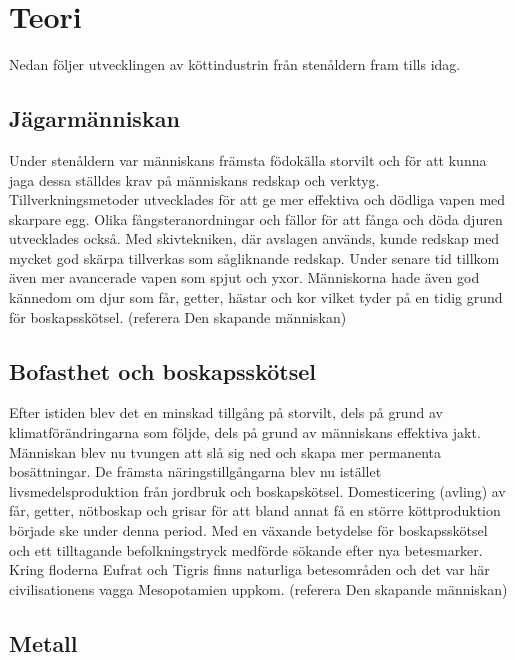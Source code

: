 \section{Teori}
Nedan följer utvecklingen av köttindustrin från stenåldern fram tills idag.

\subsection{Jägarmänniskan}
Under stenåldern var människans främsta födokälla storvilt och för att kunna jaga dessa ställdes krav på människans redskap och verktyg. Tillverkningsmetoder utvecklades för att ge mer effektiva och dödliga vapen med skarpare egg. Olika fångsteranordningar och fällor för att fånga och döda djuren utvecklades också. Med skivtekniken, där avslagen används, kunde redskap med mycket god skärpa tillverkas som sågliknande redskap. Under senare tid tillkom även mer avancerade vapen som spjut och yxor.  
\newline
\newline
Människorna hade även god kännedom om djur som får, getter, hästar och kor vilket tyder på en tidig grund för boskapsskötsel. 
\newline
(referera Den skapande människan)
     
\subsection{Bofasthet och boskapsskötsel}
Efter istiden blev det en minskad tillgång på storvilt, dels på grund av klimatförändringarna som följde, dels på grund av människans effektiva jakt. Människan blev nu tvungen att slå sig ned och skapa mer permanenta bosättningar. De främsta näringstillgångarna blev nu istället livsmedelsproduktion från jordbruk och boskapskötsel. Domesticering (avling) av får, getter, nötboskap och grisar för att bland annat få en större köttproduktion började ske under denna period. 
\newline
\newline
Med en växande betydelse för boskapsskötsel och ett tilltagande befolkningstryck medförde sökande efter nya betesmarker. Kring floderna Eufrat och Tigris finns naturliga betesområden och det var här civilisationens vagga Mesopotamien uppkom.   
\newline
\newline
(referera Den skapande människan)

\subsection{Metall}


